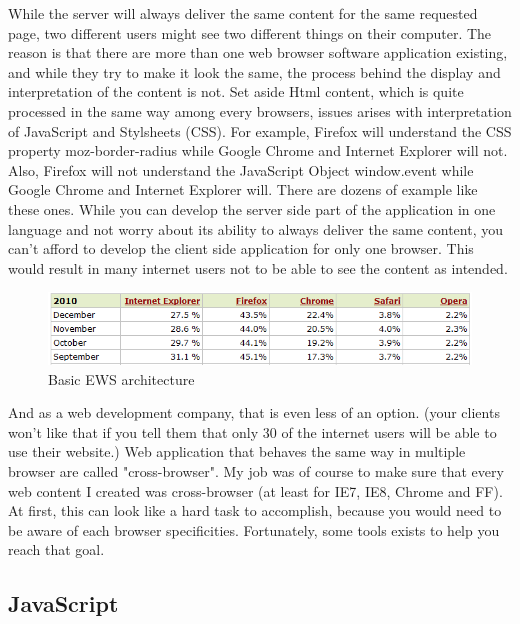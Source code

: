 While the server will always deliver the same content for the same requested page, two different users might see two different things on their computer. 
The reason is that there are more than one web browser software application existing, and while they try to make it look the same, the process behind the display and interpretation of the content is not. Set aside Html content, which is quite processed in the same way among every browsers, issues arises with interpretation of
JavaScript and Stylsheets (CSS). For example, Firefox will understand the CSS property moz-border-radius while Google Chrome and Internet Explorer will not. Also, Firefox will not understand the JavaScript Object window.event while Google Chrome and Internet Explorer will. There are dozens of example like these ones.
While you can develop the server side part of the application in one language and not worry about its ability to always deliver the same content, you can't afford to develop the client side application for only one browser. This would result in many internet users not to be able to see the content as intended.
\begin{figure}[!ht]
\centering
\includegraphics[width=.55\textwidth]{img/browser_statistics.png}
\caption{Basic EWS architecture }
\label{figure:Market Share of Web Browser}
\end{figure}
And as a web development company, that is even less of an option. (your clients won't like that if you tell them that only 30 of the internet users will be able to use their website.)
Web application that behaves the same way in multiple browser are called "cross-browser". 
My job was of course to make sure that every web content I created was cross-browser (at least for IE7, IE8, Chrome and FF).
At first, this can look like a hard task to accomplish, because you would need to be aware of each browser specificities. Fortunately, some tools exists to help you reach that goal.

\subsection{JavaScript}


